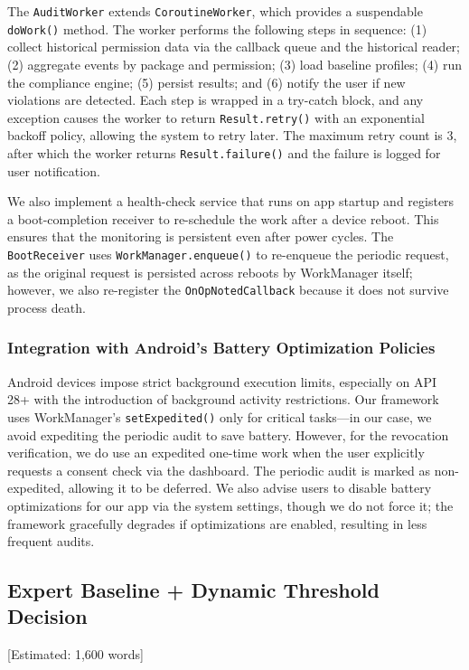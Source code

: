 The \texttt{AuditWorker} extends \texttt{CoroutineWorker}, which provides a suspendable \texttt{doWork()} method. The worker performs the following steps in sequence: (1) collect historical permission data via the callback queue and the historical reader; (2) aggregate events by package and permission; (3) load baseline profiles; (4) run the compliance engine; (5) persist results; and (6) notify the user if new violations are detected. Each step is wrapped in a try-catch block, and any exception causes the worker to return \texttt{Result.retry()} with an exponential backoff policy, allowing the system to retry later. The maximum retry count is 3, after which the worker returns \texttt{Result.failure()} and the failure is logged for user notification.

We also implement a health-check service that runs on app startup and registers a boot-completion receiver to re-schedule the work after a device reboot. This ensures that the monitoring is persistent even after power cycles. The \texttt{BootReceiver} uses \texttt{WorkManager.enqueue()} to re-enqueue the periodic request, as the original request is persisted across reboots by WorkManager itself; however, we also re-register the \texttt{OnOpNotedCallback} because it does not survive process death.

\subsubsection{Integration with Android's Battery Optimization Policies}

Android devices impose strict background execution limits, especially on API 28+ with the introduction of background activity restrictions. Our framework uses WorkManager's \texttt{setExpedited()} only for critical tasks—in our case, we avoid expediting the periodic audit to save battery. However, for the revocation verification, we do use an expedited one-time work when the user explicitly requests a consent check via the dashboard. The periodic audit is marked as non-expedited, allowing it to be deferred. We also advise users to disable battery optimizations for our app via the system settings, though we do not force it; the framework gracefully degrades if optimizations are enabled, resulting in less frequent audits.

\subsection{Expert Baseline + Dynamic Threshold Decision} [Estimated: 1,600 words]

